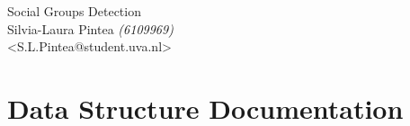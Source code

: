 \documentclass[a4paper]{book}
\begin{document}
\normalfont\normalsize
\hypersetup{pageanchor=false}
\begin{titlepage}
\vspace*{7cm}
\begin{center}
{\Large Social Groups Detection}\\
\vspace*{1cm}
{\large Silvia-Laura Pintea \emph{(6109969)}}\\
\vspace*{0.5cm}
{\small <S.L.Pintea@student.uva.nl>}\\
\end{center}
\end{titlepage}
\clearemptydoublepage
{}
\tableofcontents
\clearemptydoublepage
{}
\hypersetup{pageanchor=true}
\chapter{Data Structure Documentation}







\printindex
\end{document}
